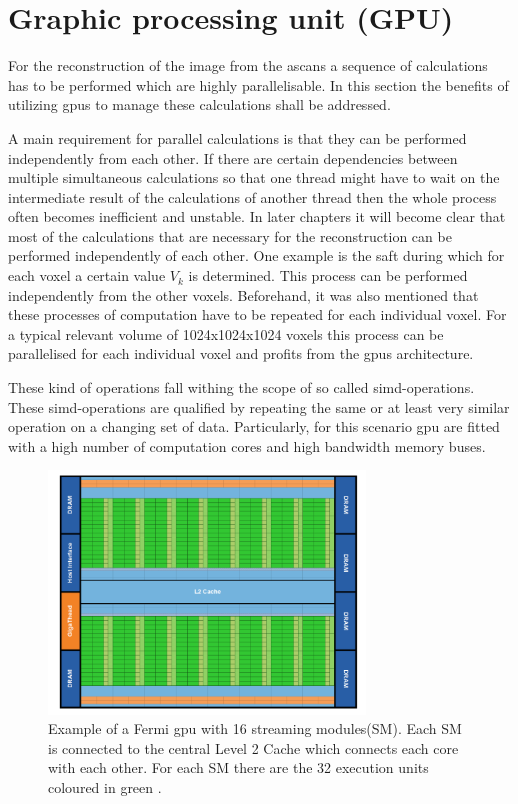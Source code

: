 \section{Graphic processing unit (GPU)}

For the reconstruction of the image from the \acp{ascan} a sequence of calculations has to be performed which are highly parallelisable. In this section the benefits of utilizing \acp{gpu} to manage these calculations shall be addressed.

A main requirement for parallel calculations is that they can be performed independently from each other.
If there are certain dependencies between multiple simultaneous calculations so that one thread might have to wait on the intermediate result of the calculations of another thread then the whole process often becomes inefficient and unstable. 
In later chapters it will become clear that most of the calculations that are necessary for the reconstruction can be performed independently of each other. One example is the \ac{saft} during which for each voxel a certain value $V_k$ is determined. This process can be performed independently from the other voxels.
Beforehand, it was also mentioned that these processes of computation have to be repeated for each individual voxel. For a typical relevant volume of 1024x1024x1024 voxels this process can be parallelised for each individual voxel and profits from the \ac{gpu}s architecture. 

These kind of operations fall withing the scope of so called \ac{simd}-operations. These \ac{simd}-operations are qualified by repeating the same or at least very similar operation on a changing set of data. Particularly, for this scenario \ac{gpu} are fitted with a high number of computation cores and high bandwidth memory buses.


\begin{figure}[H]
    \centering
    \includegraphics[width=0.75\textwidth]{Graphics/gpu_example.png}
    \caption{Example of a Fermi \ac{gpu} with 16 streaming modules(SM). Each SM is connected to the central Level 2 Cache which connects each core with each other. For each SM there are the 32 execution units coloured in green \cite{nvid_whitepaper}.}
    \label{nvidiea_aufbau}
\end{figure}


